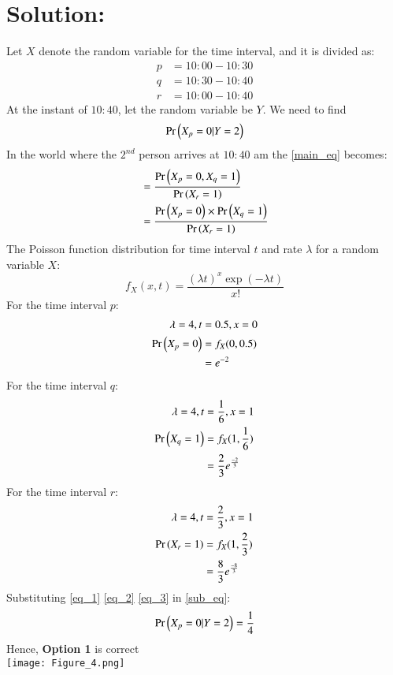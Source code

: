 \documentclass[journal,12pt,twocolumn]{IEEEtran}
\begin{document}
\section*{Solution:}
Let $X$ denote the random variable for the time interval, and it is divided as:
\begin{align*}
    p &= 10:00 - 10:30\\
    q &= 10:30 - 10:40\\
    r &= 10:00 - 10:40
\end{align*}
At the instant of $10:40$, let the random variable be $Y$.
We need to find
\begin{align}
    \Pr\left(X_p = 0 | Y = 2\right) \label{main_eq}
\end{align}
In the world where the $2^{nd}$ person arrives at $10:40$ am the \eqref{main_eq} becomes:
\begin{align}
    &=\frac{\Pr\left(X_p = 0, X_q = 1\right)}{\Pr\left(X_r = 1\right)}\\
    &= \frac{\Pr\left(X_p = 0\right) \times \Pr\left(X_q = 1\right)}{\Pr\left(X_r = 1\right)}\label{sub_eq}
\end{align}
The Poisson function distribution for time interval $t$ and rate $\lambda$ for a random variable $X$:
\[
    f_X(x,t) = \frac{(\lambda t)^x \exp{(-\lambda t)}}{x!}
\]
For the time interval $p$:
\begin{align}
    \lambda = 4, t &= 0.5, x= 0\\
    \Pr\left(X_p = 0\right) &= f_X(0,0.5)\\
    &= e^{-2}\label{eq_1}
\end{align}
For the time interval $q$:
\begin{align}
    \lambda = 4, t &= \frac{1}{6},x = 1\\
    \Pr\left(X_q = 1\right) &= f_X(1, \frac{1}{6})\\
    &= \frac{2}{3}e^{\frac{-2}{3}} \label{eq_2}
\end{align}
For the time interval $r$:
\begin{align}
    \lambda = 4, t &= \frac{2}{3}, x = 1\\
    \Pr\left(X_r = 1\right) &= f_X(1, \frac{2}{3})\\
    &= \frac{8}{3}e^{\frac{-8}{3}} \label{eq_3}
\end{align}
Substituting \eqref{eq_1} \eqref{eq_2} \eqref{eq_3} in \eqref{sub_eq}:
\begin{align}
    \Pr\left(X_p = 0 | Y = 2\right) = \frac{1}{4}
\end{align}
Hence, \textbf{Option 1} is correct\\
\texttt{[image: Figure\_4.png]}
\end{document}
